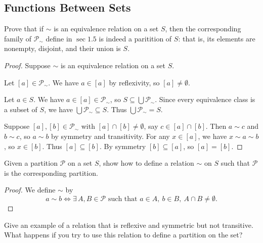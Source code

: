 \subsection{Functions Between Sets}

\begin{tcolorbox}[title=Problem 1, breakable] 
    Prove that if $\sim$ is an equivalence relation on a set $S$,
    then the corresponding family of $\mathcal{P}_{\sim}$ define in $\sec 1.5$
    is indeed a paritition of $S$: that is, its elements are nonempty,
    disjoint, and their union is $S$.
\end{tcolorbox}

\begin{proof}
    Suppose $\sim$ is an equivalence relation on a set $S$.

    Let $[a] \in \mathcal{P}_{\sim}$.
    We have $a \in [a]$ by reflexivity, so $[a] \ne \emptyset$.

    Let $a \in S$.
    We have $a \in [a] \in \mathcal{P}_{\sim}$, so $S \subseteq \bigcup \mathcal{P}_{\sim}$. 
    Since every equivalence class is a subset of $S$, we have $\bigcup \mathcal{P}_{\sim} \subseteq S$. 
    Thus $\bigcup \mathcal{P}_{\sim} = S$.

    Suppose $[a], [b] \in \mathcal{P}_{\sim}$ with $[a] \cap [b] \ne \emptyset$, say $c \in [a] \cap [b]$.
    Then $a \sim c$ and $b \sim c$, so $a \sim b$ by symmetry and transitivity.
    For any $x \in [a]$, we have $x \sim a \sim b$, so $x \in [b]$. 
    Thus $[a] \subseteq [b]$.
    By symmetry $[b] \subseteq [a]$, so $[a] = [b]$.
\end{proof}

\begin{tcolorbox}[title=Problem 3, breakable] 
    Given a partition $\mathcal{P}$ on a set $S$, show how to define 
        a relation $\sim$ on $S$ such that $\mathcal{P}$ is the corresponding partition.
\end{tcolorbox}

\begin{proof}
    We define $\sim$ by 
    \[a \sim b \iff \exists\, A, B \in \mathcal{P} \text{ such that } a \in A,\ b \in B,\ A \cap B \ne \emptyset.\]
\end{proof}


\begin{tcolorbox}[title=Problem 5, breakable] 
    Give an example of a relation that is reflexive and symmetric but not transitive.
    What happens if you try to use this relation to define a partition on the set?
\end{tcolorbox}

